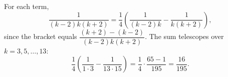 For each term,
\[\dfrac{1}{(k-2)k(k+2)}=\dfrac{1}{4}\left(\dfrac{1}{(k-2)k}-\dfrac{1}{k(k+2)}\right),\]
since the bracket equals $\dfrac{(k+2)-(k-2)}{(k-2)k(k+2)}$. The sum telescopes over $k=3,5,\dots,13$:
\[\dfrac{1}{4}\left(\dfrac{1}{1\cdot3}-\dfrac{1}{13\cdot15}\right)=\dfrac{1}{4}\cdot\dfrac{65-1}{195}=\boxed{\dfrac{16}{195}}.\]
